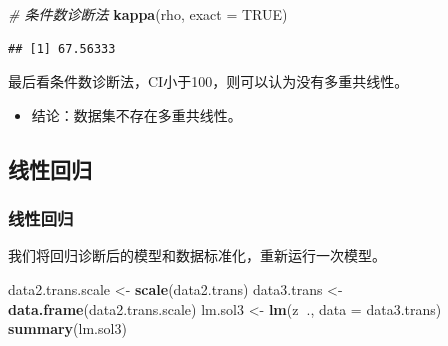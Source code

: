 \documentclass[]{article}
\newenvironment{Shaded}{\begin{snugshade}}{\end{snugshade}}
\newcommand{\KeywordTok}[1]{\textcolor[rgb]{0.13,0.29,0.53}{\textbf{#1}}}
\newcommand{\DataTypeTok}[1]{\textcolor[rgb]{0.13,0.29,0.53}{#1}}
\newcommand{\StringTok}[1]{\textcolor[rgb]{0.31,0.60,0.02}{#1}}
\newcommand{\CommentTok}[1]{\textcolor[rgb]{0.56,0.35,0.01}{\textit{#1}}}
\newcommand{\OtherTok}[1]{\textcolor[rgb]{0.56,0.35,0.01}{#1}}
\newcommand{\OperatorTok}[1]{\textcolor[rgb]{0.81,0.36,0.00}{\textbf{#1}}}
\newcommand{\NormalTok}[1]{#1}
\providecommand{\tightlist}{%
  \setlength{\itemsep}{0pt}\setlength{\parskip}{0pt}}
\begin{document}
\begin{Shaded}
\begin{Highlighting}[]
\CommentTok{# 条件数诊断法}
\KeywordTok{kappa}\NormalTok{(rho, }\DataTypeTok{exact =} \OtherTok{TRUE}\NormalTok{)}
\end{Highlighting}
\end{Shaded}

\begin{verbatim}
## [1] 67.56333
\end{verbatim}

最后看条件数诊断法，CI小于100，则可以认为没有多重共线性。

\begin{itemize}
\tightlist
\item
  结论：数据集不存在多重共线性。
\end{itemize}






%
\subsection{线性回归}

\subsubsection{线性回归}\label{-1}

我们将回归诊断后的模型和数据标准化，重新运行一次模型。

\begin{Shaded}
\begin{Highlighting}[]
\NormalTok{data2.trans.scale <-}\StringTok{ }\KeywordTok{scale}\NormalTok{(data2.trans)}
\NormalTok{data3.trans <-}\StringTok{ }\KeywordTok{data.frame}\NormalTok{(data2.trans.scale)}
\NormalTok{lm.sol3 <-}\StringTok{ }\KeywordTok{lm}\NormalTok{(z}\OperatorTok{~}\NormalTok{., }\DataTypeTok{data =}\NormalTok{ data3.trans)}
\KeywordTok{summary}\NormalTok{(lm.sol3)}
\end{Highlighting}
\end{Shaded}
\end{document}
